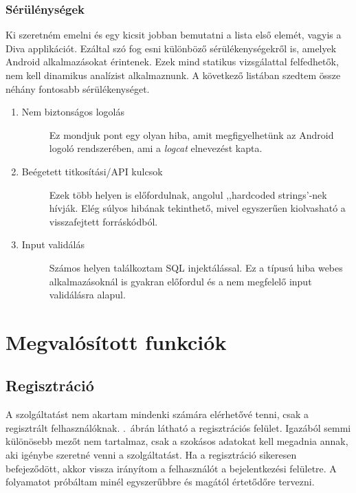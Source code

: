 \documentclass{thesis-ekf}
\theoremstyle{definition}
\theoremstyle{remark}
\begin{document}
\subsection{Sérülénységek}

Ki szeretném emelni és egy kicsit jobban bemutatni a lista első elemét, vagyis a Diva applikációt.
Ezáltal szó fog esni különböző sérülékenységekről is, amelyek Android alkalmazásokat érintenek.
Ezek mind statikus vizsgálattal felfedhetők, nem kell dinamikus analízist alkalmaznunk.
A következő listában szedtem össze néhány fontosabb sérülékenységet.

\begin{enumerate}
	\item
	\begin{description}
		\item[Nem biztonságos logolás] Ez mondjuk pont egy olyan hiba, amit megfigyelhetünk az Android logoló rendszerében, ami a \emph{logcat} elnevezést kapta.
	\end{description}
	\item
	\begin{description}
		\item [Beégetett titkosítási/API kulcsok] Ezek több helyen is előfordulnak, angolul ,,hardcoded strings'-nek hívják. Elég súlyos hibának tekinthető, mivel egyszerűen kiolvasható a visszafejtett forráskódból.
	\end{description}
	\item
	\begin{description}
		\item [Input validálás] Számos helyen találkoztam SQL injektálással. Ez a típusú hiba webes alkalmazásoknál is gyakran előfordul és a nem megfelelő input validálásra alapul.
	\end{description}
\end{enumerate}

\chapter{Megvalósított funkciók}\label{funkciok}

\section{Regisztráció}

A szolgáltatást nem akartam mindenki számára elérhetővé tenni, csak a regisztrált felhasználóknak.
.~ábrán látható a regisztrációs felület.
Igazából semmi különösebb mezőt nem tartalmaz, csak a szokásos adatokat kell megadnia annak, aki igénybe szeretné venni a szolgáltatást.
Ha a regisztráció sikeresen befejeződött, akkor vissza irányítom a felhasználót a bejelentkezési felületre.
A folyamatot próbáltam minél egyszerűbbre és magától értetődőre tervezni.
\end{document}
